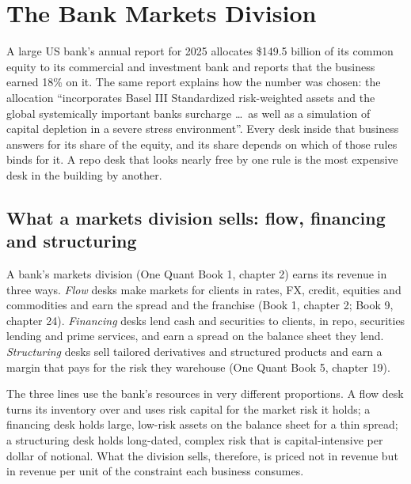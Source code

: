 \chapter{The Bank Markets Division}\label{ch:fm:the-bank-markets-division}

A large US bank's annual report for 2025 allocates \$149.5 billion of its common equity to its commercial and investment bank and reports that
the business earned 18\% on it. The same report explains how the number was chosen: the allocation ``incorporates Basel III Standardized
risk-weighted assets and the global systemically important banks surcharge \dots\ as well as a simulation of capital depletion in a severe stress
environment''. Every desk inside that business answers for its share of the equity, and its share depends on which of those rules binds for it. A
repo desk that looks nearly free by one rule is the most expensive desk in the building by another.

\section{What a markets division sells: flow, financing and structuring}

A bank's markets division (One Quant Book 1, chapter 2) earns its revenue in three ways. \emph{Flow} desks make markets for clients in rates, FX,
credit, equities and commodities and earn the spread and the franchise (Book 1, chapter 2; Book 9, chapter 24). \emph{Financing} desks lend cash
and securities to clients, in repo, securities lending and prime services, and earn a spread on the balance sheet they lend. \emph{Structuring}
desks sell tailored derivatives and structured products and earn a margin that pays for the risk they warehouse (One Quant Book 5, chapter 19).

The three lines use the bank's resources in very different proportions. A flow desk turns its inventory over and uses risk capital for the
market risk it holds; a financing desk holds large, low-risk assets on the balance sheet for a thin spread; a structuring desk holds long-dated,
complex risk that is capital-intensive per dollar of notional. What the division sells, therefore, is priced not in revenue but in revenue per
unit of the constraint each business consumes.

